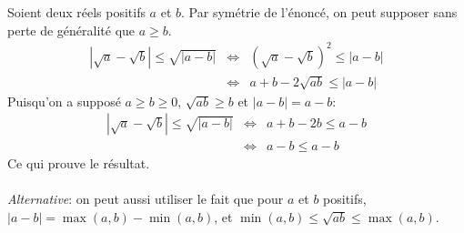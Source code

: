 Soient deux réels positifs $a$ et $b$. Par symétrie de l’énoncé, on peut supposer sans perte de généralité que $a\geq b$.
\begin{eqnarray}
  \left| \sqrt{a}-\sqrt{b} \right| \leq \sqrt{|a-b|} &\Leftrightarrow &  \left( \sqrt{a}-\sqrt{b} \right)^2 \leq |a-b| \nonumber \\
   &\Leftrightarrow &  a+b-2\sqrt{ab} \leq |a-b| \nonumber 
\end{eqnarray}
Puisqu'on a supposé $a \geq b \geq 0$, $\sqrt{ab}\geq b$ et $|a-b|=a-b$:
\begin{eqnarray}
  \left| \sqrt{a}-\sqrt{b} \right| \leq \sqrt{|a-b|} &\Leftrightarrow &  a+b-2b \leq a-b \nonumber \\
  &\Leftrightarrow &  a-b \leq a-b \nonumber
\end{eqnarray}
Ce qui prouve le résultat.\\ \\
\textit{Alternative}: on peut aussi utiliser le fait que pour $a$ et $b$ positifs, $|a-b|=\max(a,b)-\min(a,b)$, et $\min(a,b) \leq \sqrt{ab} \leq \max(a,b)$.
 
